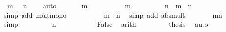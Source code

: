 \begin{isabellebody}
\ {}{\isacharcolon}{\kern0pt}\ {\isachardoublequoteopen}m\ {\isasymnoteq}\ {}{\isachardoublequoteclose}\ {\isachardoublequoteopen}n\ {\isasymnoteq}\ {}{\isachardoublequoteclose}\ \isamarkupfalse%
\ auto\isanewline
\ \ \isamarkupfalse%
\ {\isachardoublequoteopen}{\isasymnot}\ {}\ {\isasymle}\ {\isasymbar}m{\isasymbar}{\isachardoublequoteclose}\isanewline
\ \ \isamarkupfalse%
\isanewline
\ \ \ \ \isamarkupfalse%
\ {\isachardoublequoteopen}{}\ {\isasymle}\ {\isasymbar}m{\isasymbar}{\isachardoublequoteclose}\isanewline
\ \ \ \ \isamarkupfalse%
\ \isamarkupfalse%
\ {\isachardoublequoteopen}{}\ {\isacharasterisk}{\kern0pt}\ {\isasymbar}n{\isasymbar}\ {\isasymle}\ {\isasymbar}m{\isasymbar}\ {\isacharasterisk}{\kern0pt}\ {\isasymbar}n{\isasymbar}{\isachardoublequoteclose}\ \isamarkupfalse%
\ {\isacharparenleft}{\kern0pt}simp\ add{\isacharcolon}{\kern0pt}\ mult{\isacharunderscore}{\kern0pt}mono\ {}{\isacharparenright}{\kern0pt}\isanewline
\ \ \ \ \isamarkupfalse%
\ \isamarkupfalse%
\ {\isachardoublequoteopen}{\isasymdots}\ {\isacharequal}{\kern0pt}\ {\isasymbar}m\ {\isacharasterisk}{\kern0pt}\ n{\isasymbar}{\isachardoublequoteclose}\ \isamarkupfalse%
\ {\isacharparenleft}{\kern0pt}simp\ add{\isacharcolon}{\kern0pt}\ abs{\isacharunderscore}{\kern0pt}mult{\isacharparenright}{\kern0pt}\isanewline
\ \ \ \ \isamarkupfalse%
\ \isamarkupfalse%
\ mn\ \isamarkupfalse%
\ {\isachardoublequoteopen}{\isasymdots}\ {\isacharequal}{\kern0pt}\ {}{\isachardoublequoteclose}\ \isamarkupfalse%
\ simp\isanewline
\ \ \ \ \isamarkupfalse%
\ \isamarkupfalse%
\ {\isachardoublequoteopen}{}\ {\isacharasterisk}{\kern0pt}\ {\isasymbar}n{\isasymbar}\ {\isasymle}\ {}{\isachardoublequoteclose}\ \isacommand{{\isachardot}{\kern0pt}}\isamarkupfalse%
\isanewline
\ \ \ \ \isamarkupfalse%
\ {}\ \isamarkupfalse%
\ {\isachardoublequoteopen}False{\isachardoublequoteclose}\ \isamarkupfalse%
\ arith\isanewline
\ \ \isamarkupfalse%
\isanewline
\ \ \isamarkupfalse%
\ {}\ \isamarkupfalse%
\ {\isacharquery}{\kern0pt}thesis\ \isamarkupfalse%
\ auto\isanewline
{}\isamarkupfalse%
%

\end{isabellebody}
